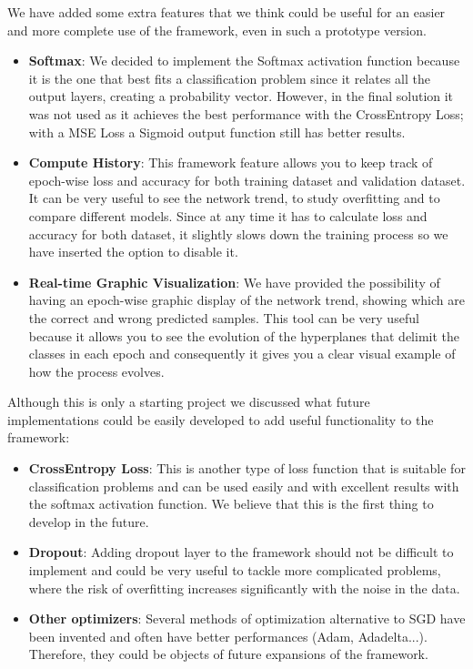 We have added some extra features that we think could be useful for an easier and more complete use of the framework, even in such a prototype version.
\begin{itemize}
	\item \textbf{Softmax}: We decided to implement the Softmax activation function because it is the one that best fits a classification problem since it relates all the output layers, creating a probability vector. However, in the final solution it was not used as it achieves the best performance with the CrossEntropy Loss; with a MSE Loss a Sigmoid output function still has better results.
	\item \textbf{Compute History}: This framework feature allows you to keep track of epoch-wise loss and accuracy for both training dataset and validation dataset. It can be very useful to see the network trend, to study overfitting and to compare different models. Since at any time it has to calculate loss and accuracy for both dataset, it slightly slows down the training process so we have inserted the option to disable it.
	\item \textbf{Real-time Graphic Visualization}: We have provided the possibility of having an epoch-wise graphic display of the network trend, showing which are the correct and wrong predicted samples. This tool can be very useful because it allows you to see the evolution of the hyperplanes that delimit the classes in each epoch and consequently it gives you a clear visual example of how the process evolves.
\end{itemize}

Although this is only a starting project we discussed what future implementations could be easily developed to add useful functionality to the framework:
\begin{itemize}
	\item \textbf{CrossEntropy Loss}: This is another type of loss function that is suitable for classification problems and can be used easily and with excellent results with the softmax activation function. We believe that this is the first thing to develop in the future.
	\item \textbf{Dropout}: Adding dropout layer to the framework should not be difficult to implement and could be very useful to tackle more complicated problems, where the risk of overfitting increases significantly with the noise in the data.
	\item \textbf{Other optimizers}: Several methods of optimization alternative to SGD have been invented and often have better performances (Adam, Adadelta...). Therefore, they could be objects of future expansions of the framework.
\end{itemize}
